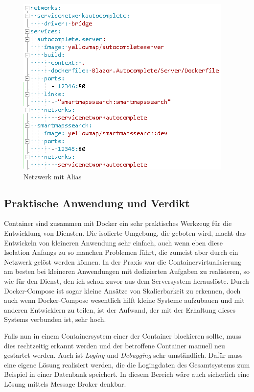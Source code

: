 \documentclass[12pt,a4paper]{scrartcl}
\begin{document}
\begin{figure}[h!]
	\centering
	\includegraphics[scale=1]{DockerComposeNetwork.png}
	\caption[Screenshot]{Netzwerk mit Alias}
\end{figure}

\subsection{Praktische Anwendung und Verdikt}

Container sind zusammen mit Docker ein sehr praktisches Werkzeug für die Entwicklung von Diensten. Die isolierte Umgebung, die geboten wird, macht das Entwickeln von kleineren Anwendung  sehr einfach, auch wenn eben diese Isolation Anfangs zu so manchen Problemen führt, die zumeist aber durch ein Netzwerk gelöst werden können. In der Praxis war die Containervirtualisierung am besten bei kleineren Anwendungen mit dedizierten Aufgaben zu realisieren, so wie für den Dienst, den ich schon zuvor aus dem Serversystem herauslöste. Durch Docker-Compose ist sogar kleine Ansätze von Skalierbarkeit zu erkennen, doch auch wenn Docker-Compose wesentlich hilft kleine Systeme aufzubauen und mit anderen Entwicklern zu teilen, ist der Aufwand, der mit der Erhaltung dieses Systems verbunden ist, sehr hoch.

Falls nun in einem Containersystem einer der Container blockieren sollte, muss dies rechtzeitig erkannt werden und der betroffene Container manuell neu gestartet werden. Auch ist \emph{Loging} und \emph{Debugging} sehr umständlich. Dafür muss eine eigene Lösung realisiert werden, die die Logingdaten des Gesamtsystems zum Beispiel in einer Datenbank speichert. In diesem Bereich wäre auch sicherlich eine Lösung mittels Message Broker denkbar.
\end{document}
